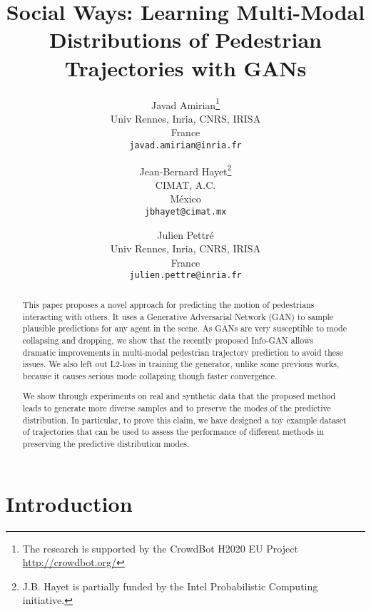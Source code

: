 \documentclass[10pt,twocolumn,letterpaper]{article}
\begin{document}
\title{Social Ways: Learning Multi-Modal Distributions of Pedestrian Trajectories with GANs}

\author{Javad Amirian\thanks{The research is supported by the CrowdBot H2020 EU Project
		\url{http://crowdbot.org/}}\\
	Univ Rennes, Inria, CNRS, IRISA\\
	France\\
	{\tt\small javad.amirian@inria.fr}
\and
	Jean-Bernard Hayet\thanks{J.B. Hayet is partially funded by the Intel Probabilistic Computing initiative.}\\
	CIMAT, A.C.\\
	M\'exico\\
	{\tt\small jbhayet@cimat.mx}
	\and
	Julien Pettr{\'e}\\
	Univ Rennes, Inria, CNRS, IRISA\\
	France\\
	{\tt\small julien.pettre@inria.fr}
}


\maketitle

\thispagestyle{empty}




\begin{abstract}
This paper proposes a novel approach for predicting the motion of pedestrians interacting with others. It uses a Generative Adversarial Network (GAN) to sample plausible predictions for any agent in the scene. As GANs are very susceptible to mode collapsing and dropping, we show that the recently proposed Info-GAN allows dramatic improvements in multi-modal pedestrian trajectory prediction to avoid these issues. We also left out L2-loss in training the generator, unlike some previous works, because it causes serious mode collapsing though faster convergence.

We show through experiments on real and synthetic data that the proposed method leads to generate more diverse samples and to preserve the modes of the predictive distribution. In particular, to prove this claim, we have designed a toy example dataset of trajectories that can be used to assess the performance of different methods in preserving the predictive distribution modes.
\end{abstract}



\section{Introduction}
\end{document}
